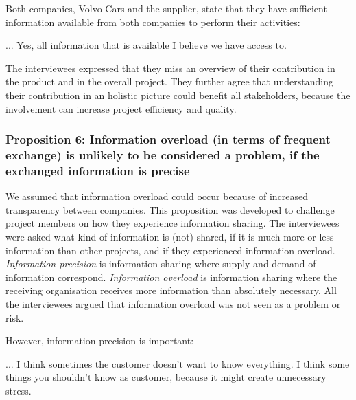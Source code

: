  Both companies, Volvo Cars and the supplier, state that they have sufficient information available from both companies to perform their activities:

\begin{aquote}{...}
Yes, all information that is available I believe we have access to.
\end{aquote}

 The interviewees expressed that they miss an overview of their contribution in the product and in the overall project. They further agree that understanding their contribution in an holistic picture could benefit all stakeholders, because the involvement can increase project efficiency and quality.


\vspace{.2cm}
\subsubsection{Proposition 6: Information overload (in terms of frequent exchange) is unlikely to be considered a problem, if the exchanged information is precise}


We assumed that information overload could occur because of increased transparency between companies. This proposition was developed to challenge project members on how they experience information sharing. The interviewees were asked what kind of information is (not) shared, if it is much more or less information than other projects, and if they experienced information overload. {\em Information precision} is information sharing where supply and demand of information correspond. {\em Information overload} is information sharing where the receiving organisation receives more information than absolutely necessary. All the interviewees argued that information overload was not seen as a problem or risk.

However, information precision is important:

\begin{aquote}{...}
I think sometimes the customer doesn't want to know everything. I think some things you shouldn't know as customer, because it might create unnecessary stress.
\end{aquote}

